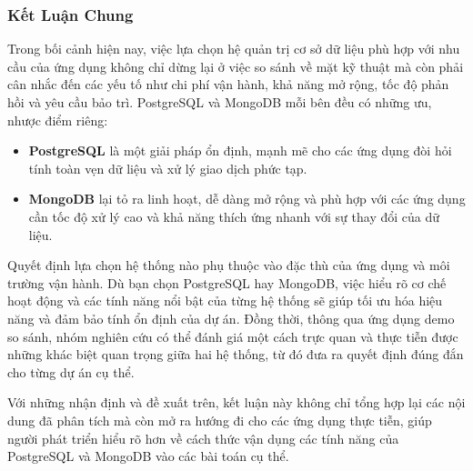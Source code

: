 \subsubsection{Kết Luận Chung}


Trong bối cảnh hiện nay, việc lựa chọn hệ quản trị cơ sở dữ liệu phù hợp với nhu cầu của ứng dụng không chỉ dừng lại ở việc so sánh về mặt kỹ thuật mà còn phải cân nhắc đến các yếu tố như chi phí vận hành, khả năng mở rộng, tốc độ phản hồi và yêu cầu bảo trì. PostgreSQL và MongoDB mỗi bên đều có những ưu, nhược điểm riêng:

\begin{itemize}
    \item \textbf{PostgreSQL} là một giải pháp ổn định, mạnh mẽ cho các ứng dụng đòi hỏi tính toàn vẹn dữ liệu và xử lý giao dịch phức tạp.
    \item \textbf{MongoDB} lại tỏ ra linh hoạt, dễ dàng mở rộng và phù hợp với các ứng dụng cần tốc độ xử lý cao và khả năng thích ứng nhanh với sự thay đổi của dữ liệu.
\end{itemize}

Quyết định lựa chọn hệ thống nào phụ thuộc vào đặc thù của ứng dụng và môi trường vận hành. Dù bạn chọn PostgreSQL hay MongoDB, việc hiểu rõ cơ chế hoạt động và các tính năng nổi bật của từng hệ thống sẽ giúp tối ưu hóa hiệu năng và đảm bảo tính ổn định của dự án. Đồng thời, thông qua ứng dụng demo so sánh, nhóm nghiên cứu có thể đánh giá một cách trực quan và thực tiễn được những khác biệt quan trọng giữa hai hệ thống, từ đó đưa ra quyết định đúng đắn cho từng dự án cụ thể.

Với những nhận định và đề xuất trên, kết luận này không chỉ tổng hợp lại các nội dung đã phân tích mà còn mở ra hướng đi cho các ứng dụng thực tiễn, giúp người phát triển hiểu rõ hơn về cách thức vận dụng các tính năng của PostgreSQL và MongoDB vào các bài toán cụ thể.